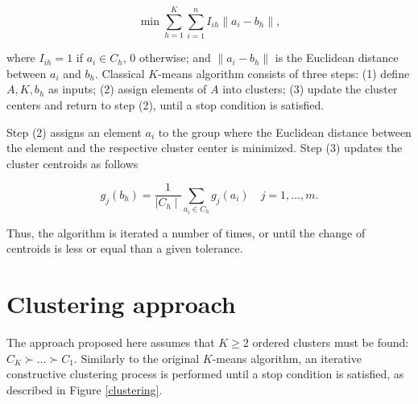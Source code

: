 \documentclass[]{elsarticle}
\theoremstyle{definition}
\begin{document}
\begin{equation}
\min \sum_{h=1}^{K} \sum_{i=1}^{n} I_{ih} \left\| a_i-b_h \right\|,
\end{equation}


\noindent
where  $I_{ih}=1$ if $a_i \in C_h$, $0$ otherwise; and $ \left\| a_i-b_h \right\|$ is the Euclidean distance between $a_i$ and $b_h$.  Classical $K$-means algorithm consists of three steps: (1) define $A, K, b_h$ as inputs; (2) assign elements of $A$ into clusters; (3) update the cluster centers and return to step (2), until a stop condition is satisfied.   

Step (2) assigns an element $a_i$ to the group where the Euclidean distance between the element and the respective cluster center is minimized.  Step (3) updates the cluster centroids as follows


\begin{equation}
g_j(b_h) = \frac{1}{\mid C_h \mid} \sum_{a_i \in C_h} g_j(a_i) \quad j=1,\ldots,m. \label{newcentroid}
\end{equation}

\noindent
Thus, the algorithm is iterated a number of times, or until the  change of centroids is less or equal than a given tolerance.


\section{Clustering approach}\label{approach}

The approach proposed here assumes that $K\geq 2$ ordered clusters must be found: $C_K \succ \ldots \succ C_1$. Similarly to the original $K$-means algorithm, an iterative constructive clustering process is performed until a stop condition is satisfied, as described  in Figure \ref{clustering}.  
\end{document}
